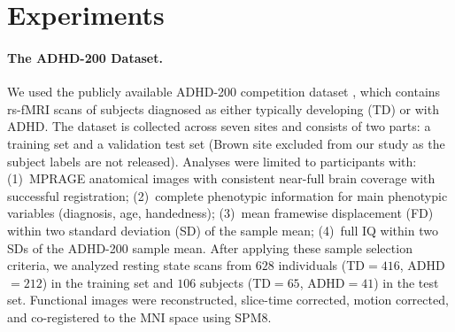 \vspace{-2pt}\section{Experiments}
\vspace{-2pt}\paragraph{The ADHD-200 Dataset.}
We used the publicly available ADHD-200 competition dataset \cite{ADHD200}, which contains rs-fMRI scans of subjects diagnosed as either typically developing (TD) or with ADHD. 
The dataset is collected across seven sites and consists of two parts: a training set and a validation test set (Brown site excluded from our study as the subject labels are not released).
Analyses were limited to participants with: 
(1)~MPRAGE anatomical images with consistent near-full brain coverage with successful registration; 
(2)~complete phenotypic information for main phenotypic variables (diagnosis, age, handedness); 
(3)~mean framewise displacement (FD) within two standard deviation (SD) of the sample mean;
(4)~full IQ within two SDs of the \mbox{ADHD-200} sample mean.
After applying these sample selection criteria, we analyzed resting state scans from $628$ individuals (TD${=}416$, ADHD${=}212$) in the training set and $106$ subjects (TD${=}65$, ADHD${=}41$) in the test set.
Functional images were reconstructed, slice-time corrected, motion corrected, and co-registered to the MNI space using SPM$8$.

